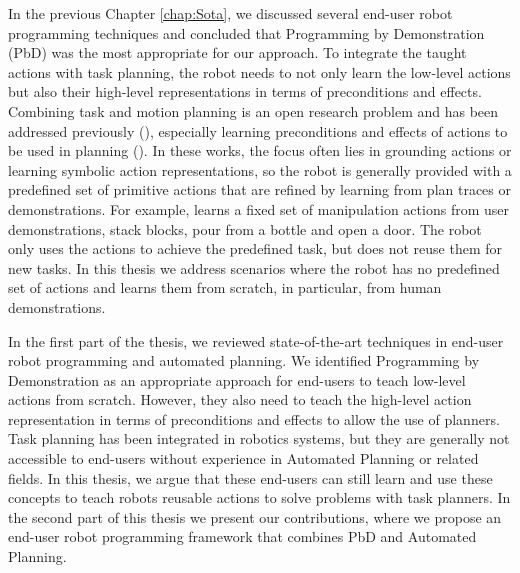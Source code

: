 In the previous Chapter \ref{chap:Sota}, we discussed several end-user robot programming techniques and concluded that Programming by Demonstration (PbD) was the most appropriate for our approach.
To integrate the taught actions with task planning, the robot needs to not only learn the low-level actions but also their high-level representations in terms of preconditions and effects.
Combining task and motion planning is an open research problem and has been addressed previously (\cite{ferrer2015planning,garrett2015ffrob}), especially learning preconditions and effects of actions to be used in planning (\cite{jetchev2013learning,ahmadzadeh2015learning,konidaris2018fromSkills,ugur2015bottom}).
In these works, the focus often lies in grounding actions or learning symbolic action representations, so the robot is generally provided with a predefined set of primitive actions that are refined by learning from plan traces or demonstrations.
For example, \citet{abdo2013learning} learns a fixed set of manipulation actions from user demonstrations, \ie stack blocks, pour from a bottle and open a door.
The robot only uses the actions to achieve the predefined task, but does not reuse them for new tasks.
In this thesis we address scenarios where the robot has no predefined set of actions and learns them from scratch, in particular, from human demonstrations.

In the first part of the thesis, we reviewed state-of-the-art techniques in end-user robot programming and automated planning.
We identified Programming by Demonstration as an appropriate approach for end-users to teach low-level actions from scratch.
However, they also need to teach the high-level action representation in terms of preconditions and effects to allow the use of planners.
Task planning has been integrated in robotics systems, but they are generally not accessible to end-users without experience in Automated Planning or related fields.
In this thesis, we argue that these end-users can still learn and use these concepts to teach robots reusable actions to solve problems with task planners.
In the second part of this thesis we present our contributions, where we propose an end-user robot programming framework that combines PbD and Automated Planning.


